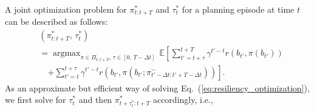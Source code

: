 \documentclass[letterpaper]{article} %
\newcommand{\argmax}{\mathop{\mathrm{argmax}}}
\begin{document}
A joint optimization problem for $\pi_{t:t+T}^*$ and $\tau_t^*$ for a planning episode at time $t$ can be described as follows:
%
%
\small
\begin{align}
  &(\pi_{t:t+T}^*, \, \tau_t^*)
  \nonumber \\
  & = \argmax_{\pi \in \Pi_{t:t+T}, \, \tau \in [0,\, T-\Delta t]} \, \mathbb{E} \left[ \sum_{t'=t+\tau}^{t+T} \gamma^{t'-t} r(b_{t'}, \pi(b_{t'})) \right.
  \nonumber \\
  &\quad \left. + \sum_{t'=t}^{t+\tau} \gamma^{t'-t} r(b_{t'}, \pi(b_{t'}; \pi_{{t'}-\Delta t:{t'}+T-\Delta t}^-)) \right] \!\!.
  \label{eq:resiliency_optimization}
\end{align}
\normalsize
%
As an approximate but efficient way of solving Eq.~(\ref{eq:resiliency_optimization}), we first solve for $\tau^*_t$ and then $\pi^*_{t+\tau^*_t:t+T}$ accordingly, i.e., 
\small
\end{document}
